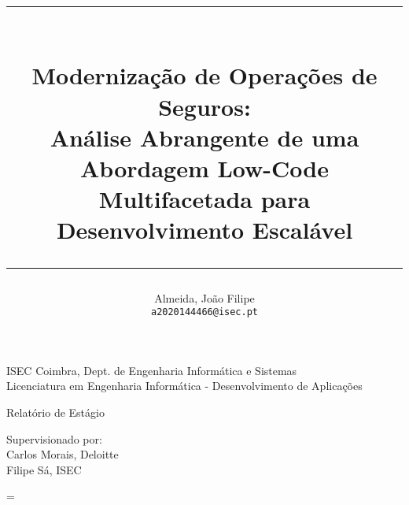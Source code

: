 \title{
    \rule{\textwidth}{2pt}\\[2ex]
    \medskip
    \Large\bfseries\centering Modernização de Operações de Seguros: \\
    Análise Abrangente de uma Abordagem Low-Code Multifacetada para Desenvolvimento Escalável
    \rule{\textwidth}{2pt}
}

\author{%
  Almeida, João Filipe\\
  \texttt{a2020144466@isec.pt}
}
\renewcommand\maketitlehooka{%
  \begin{center}
    \centering
    \hfill
    \texttt{[image: imgs/logo-isec-transparente.png]}  %
    \medskip
    \begin{center}
    {\footnotesize 
    Deloitte Touche Tohmatsu Limited \& Instituto Superior de Engenharia de Coimbra \\ %
    }
    \end{center}
  \end{center}%
}




\setcounter{secnumdepth}{0} %

\maketitle

\thispagestyle{empty} %
    
\vspace{-0.5cm}

\begin{center}
{\small 
ISEC Coimbra, Dept. de Engenharia Informática e Sistemas \\
}
{\footnotesize
Licenciatura em Engenharia Informática - Desenvolvimento de Aplicações \\ }
\end{center}


\vfill %

{\centering
    \large{Relatório de Estágio} \\
    \vspace{0.5cm} %

    {\small
    Supervisionado por: \\
    Carlos Morais, Deloitte \\
    Filipe Sá, ISEC \\ }
}

\baselineskip=\normalbaselineskip
\restoregeometry